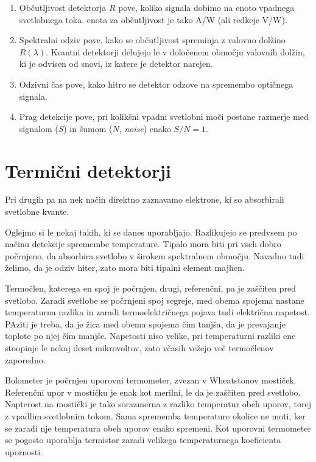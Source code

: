 \begin{enumerate}
\item Občutljivost detektorja $R$ pove, koliko signala dobimo na enoto vpadnega svetlobnega toka. 
enota za občutljivost je tako A/W (ali redkeje V/W). 
\item Spektralni odziv pove, kako se občutljivost spreminja z valovno dolžino $R(\lambda)$. 
Kvantni detektorji delujejo le v določenem območju valovnih dolžin, ki je odvisen od snovi, 
iz katere je detektor narejen. 
\item Odzivni čas pove, kako hitro se detektor odzove na spremembo optičnega signala. 
\item Prag detekcije pove, pri kolikšni vpadni svetlobni moči postane razmerje med signalom ($S$)
in šumom ($N$, {\it noise}) enako $S/N = 1$. 
\end{enumerate}




\section{Termični detektorji}


Pri drugih pa na nek način direktno zaznavamo elektrone, ki so absorbirali svetlobne kvante.



Oglejmo si le  nekaj takih, ki se danes uporabljajo. Razlikujejo se predvsem po načinu
detekcije spremembe temperature. Tipalo mora biti pri vseh dobro počrnjeno, da absorbira
svetlobo v širokem spektralnem območju. Navadno tudi želimo, da je odziv hiter, zato mora 
biti tipalni element majhen.

Termočlen, katerega en spoj je počrnjen, drugi, referenčni, pa je zaščiten pred svetlobo.
Zaradi svetlobe se počrnjeni spoj segreje, med obema spojema nastane temperaturna razlika in 
zaradi termoelektričnega pojava tudi električna napetost. PAziti je treba, da je žica med 
obema spojema čim tanjša, da je prevajanje toplote po njej čim manjše. Napetosti niso velike,
pri temperaturni razliki ene stoopinje le nekaj deset mikrovoltov, zato včasih vežejo 
več termočlenov zaporedno.

Bolometer je počrnjen uporovni termometer, zvezan v Wheatstonov mostiček. Referenčni upor v
mostičku je enak kot merilni, le da je zaščiten pred svetlobo. Napterost na mostički je tako 
sorazmerna z razliko temperatur obeh uporov, torej z vpadlim svetlobnim tokom. Sama
sprememba temperature okolice ne moti, ker se zaradi nje temperatura obeh uporov enako spremeni. 
Kot uporovni termometer se pogosto uporablja termistor zaradi velikega temperaturnega koeficienta
upornosti.


